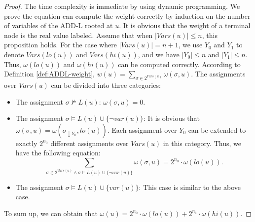 \begin{proposition}
		\begin{proof}
            The time complexity is immediate by using dynamic programming.
            We prove the equation can compute the weight correctly by induction on the number of variables of the ADD-L rooted at $u$.
            It is obvious that the weight of a terminal node is the real value labeled. 
            Assume that when $|\mathit{Vars}(u)| \le n$, this proposition holds. 
            For the case where $|\mathit{Vars}(u)| = n + 1$, we use $Y_0$ and $Y_1$ to denote $\mathit{Vars}(lo(u))$ and $\mathit{Vars}(hi(u))$, and we have $|Y_0| \le n$ and $|Y_1| \le n$.
            Thus, $\mathit{\omega}(lo(u))$ and $\mathit{\omega}(hi(u))$ can be computed correctly.
            According to Definition \ref{def:ADDL-weight}, $w(u) = \sum_{\sigma \in 2^{\mathit{Vars}(u)}}\omega(\sigma,u)$.
            The assignments over $\mathit{Vars}(u)$ can be divided into three categories: 
            \begin{itemize}
              \item The assignment $\sigma \not\models L(u)$: $\omega(\sigma, u) = 0$.
              \item The assignment $\sigma \models L(u) \cup \{\lnot \mathit{var}(u)\}$: 
              It is obvious that $\omega(\sigma, u) = \omega(\sigma_{\downarrow Y_0}, lo(u))$. 
              Each assignment over $Y_0$ can be extended to exactly $2^{n_0}$ different assignments over $\mathit{Vars}(u)$ in this category. Thus, we have the following equation:
              $$\sum_{\sigma \in 2^{\mathit{Vars}(u)} \land \sigma \models L(u) \cup \{\lnot \mathit{var}(u)\}}\omega(\sigma, u) = 2^{n_0} \cdot \mathit{\omega}(lo(u)).$$
              \item The assignment $\sigma \models L(u) \cup \{\mathit{var}(u)\}$: This case is similar to the above case.
            \end{itemize}
            To sum up, we can obtain that $\mathit{\omega}(u) = 2^{n_0} \cdot \mathit{\omega}(lo(u)) + 2^{n_1} \cdot \mathit{\omega}(hi(u))$.	
		\end{proof}
		
	\end{proposition}
	
